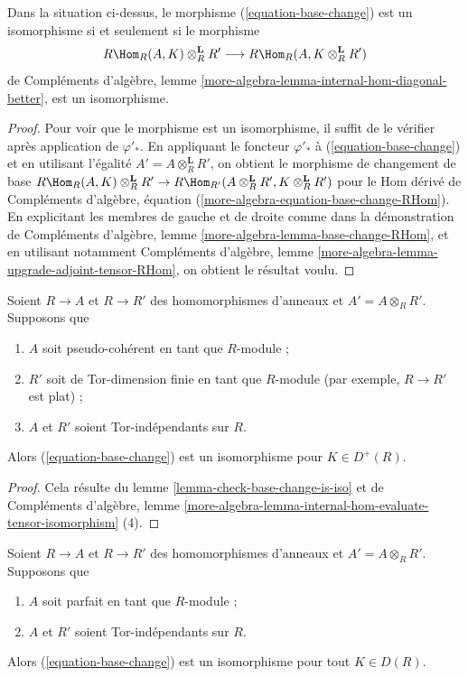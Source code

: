 \begin{lemma}
\label{lemma-check-base-change-is-iso}
Dans la situation ci-dessus, le morphisme (\ref{equation-base-change})
est un isomorphisme si et seulement si le morphisme
$$
R\Hom_R(A, K) \otimes_R^\mathbf{L} R'
\longrightarrow
R\Hom_R(A, K \otimes_R^\mathbf{L} R')
$$
de Compléments d'algèbre, lemme \ref{more-algebra-lemma-internal-hom-diagonal-better}, est un isomorphisme.
\end{lemma}

\begin{proof}
Pour voir que le morphisme est un isomorphisme, il suffit de le vérifier
après application de $\varphi'_*$.
En appliquant le foncteur $\varphi'_*$ à (\ref{equation-base-change})
et en utilisant l'égalité $A' = A \otimes_R^\mathbf{L} R'$, on obtient le morphisme de changement de base
$R\Hom_R(A, K) \otimes_R^\mathbf{L} R' \to
R\Hom_{R'}(A \otimes_R^\mathbf{L} R', K \otimes_R^\mathbf{L} R')$
pour le Hom dérivé de Compléments d'algèbre, équation (\ref{more-algebra-equation-base-change-RHom}).
En explicitant les membres de gauche et de droite comme dans la démonstration
de Compléments d'algèbre, lemme \ref{more-algebra-lemma-base-change-RHom}, et en utilisant notamment
Compléments d'algèbre, lemme \ref{more-algebra-lemma-upgrade-adjoint-tensor-RHom}, on obtient le résultat voulu.
\end{proof}

\begin{lemma}
\label{lemma-flat-bc-surjection}
Soient $R \to A$ et $R \to R'$ des homomorphismes d'anneaux et $A' = A \otimes_R R'$.
Supposons que
\begin{enumerate}
\item $A$ soit pseudo-cohérent en tant que $R$-module ;
\item $R'$ soit de Tor-dimension finie en tant que $R$-module
(par exemple, $R \to R'$ est plat) ;
\item $A$ et $R'$ soient Tor-indépendants sur $R$.
\end{enumerate}
Alors (\ref{equation-base-change}) est un isomorphisme pour $K \in D^+(R)$.
\end{lemma}

\begin{proof}
Cela résulte du lemme \ref{lemma-check-base-change-is-iso} et de
Compléments d'algèbre, lemme \ref{more-algebra-lemma-internal-hom-evaluate-tensor-isomorphism} (4).
\end{proof}

\begin{lemma}
\label{lemma-bc-surjection}
Soient $R \to A$ et $R \to R'$ des homomorphismes d'anneaux et $A' = A \otimes_R R'$.
Supposons que
\begin{enumerate}
\item $A$ soit parfait en tant que $R$-module ;
\item $A$ et $R'$ soient Tor-indépendants sur $R$.
\end{enumerate}
Alors (\ref{equation-base-change}) est un isomorphisme pour tout $K \in D(R)$.
\end{lemma}

